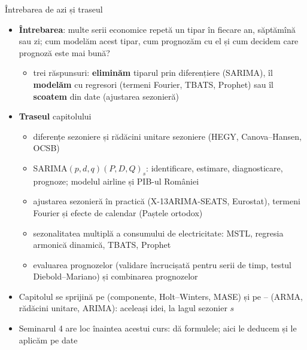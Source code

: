 \begin{frame}{Întrebarea de azi și traseul}
\itemsize{\footnotesize}
\begin{itemize}
    \item \textbf{Întrebarea}: multe serii economice repetă un tipar în fiecare an, săptămînă sau zi; cum modelăm acest tipar, cum prognozăm cu el și cum decidem care prognoză este mai bună?
    \begin{itemize}
        \item trei răspunsuri: \textbf{eliminăm} tiparul prin diferențiere (SARIMA), îl \textbf{modelăm} cu regresori (termeni Fourier, TBATS, Prophet) sau îl \textbf{scoatem} din date (ajustarea sezonieră)
    \end{itemize}
    \item \textbf{Traseul} capitolului
    \begin{itemize}
        \item diferențe sezoniere și rădăcini unitare sezoniere (HEGY, Canova--Hansen, OCSB)
        \item SARIMA$(p,d,q)(P,D,Q)_s$: identificare, estimare, diagnosticare, prognoze; modelul airline și PIB-ul României
        \item ajustarea sezonieră în practică (X-13ARIMA-SEATS, Eurostat), termeni Fourier și efecte de calendar (Paștele ortodox)
        \item sezonalitatea multiplă a consumului de electricitate: MSTL, regresia armonică dinamică, TBATS, Prophet
        \item evaluarea prognozelor (validare încrucișată pentru serii de timp, testul Diebold--Mariano) și combinarea prognozelor
    \end{itemize}
    \item Capitolul se sprijină pe  (componente, Holt--Winters, MASE) și pe -- (ARMA, rădăcini unitare, ARIMA): aceleași idei, la lagul sezonier $s$
    \item Seminarul 4 are loc înaintea acestui curs: dă formulele; aici le deducem și le aplicăm pe date
\end{itemize}
\end{frame}

